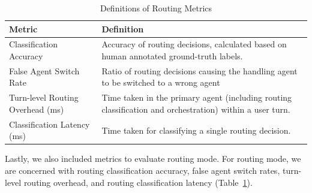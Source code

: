\begin{table}[t]
    \caption{Definitions of Routing Metrics}
    \label{tab:routing_define}
    \centering
    \footnotesize
    \begin{tabular}{p{4cm}p{8cm}}
    \toprule
    Metric  & Definition  \\
    \midrule
    Classification Accuracy & Accuracy of routing decisions, calculated based on human annotated ground-truth labels. \\
    \midrule
    False Agent Switch Rate & Ratio of routing decisions causing the handling agent to be switched to a wrong agent \\
    \midrule
    Turn-level Routing Overhead (ms) & Time taken in the primary agent (including routing classification and orchestration) within a user turn. \\
    \midrule
    Classification Latency (ms) & Time taken for classifying a single routing decision. \\
    \bottomrule
    \end{tabular}
\end{table}

Lastly, we also included metrics to evaluate routing mode. For routing mode, we are concerned with routing classification accuracy, false agent switch rates, turn-level routing overhead, and routing classification latency (Table~\ref{tab:routing_define}).